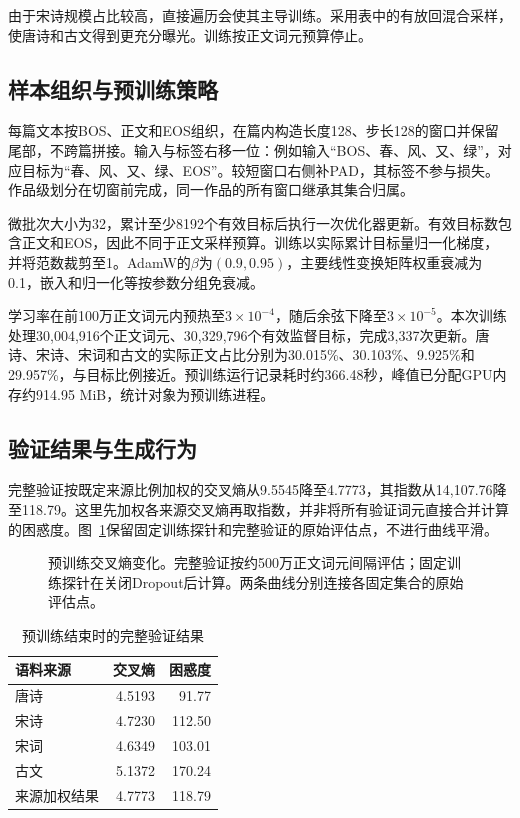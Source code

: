 由于宋诗规模占比较高，直接遍历会使其主导训练。采用表中的有放回混合采样，使唐诗和古文得到更充分曝光。训练按正文词元预算停止。

\subsection{样本组织与预训练策略}

每篇文本按BOS、正文和EOS组织，在篇内构造长度128、步长128的窗口并保留尾部，不跨篇拼接。输入与标签右移一位：例如输入“BOS、春、风、又、绿”，对应目标为“春、风、又、绿、EOS”。较短窗口右侧补PAD，其标签不参与损失。作品级划分在切窗前完成，同一作品的所有窗口继承其集合归属。

微批次大小为32，累计至少8192个有效目标后执行一次优化器更新。有效目标数包含正文和EOS，因此不同于正文采样预算。训练以实际累计目标量归一化梯度，并将范数裁剪至1。AdamW的$\beta$为$(0.9,0.95)$，主要线性变换矩阵权重衰减为0.1，嵌入和归一化等按参数分组免衰减。

学习率在前100万正文词元内预热至$3\times10^{-4}$，随后余弦下降至$3\times10^{-5}$。本次训练处理30,004,916个正文词元、30,329,796个有效监督目标，完成3,337次更新。唐诗、宋诗、宋词和古文的实际正文占比分别为30.015\%、30.103\%、9.925\%和29.957\%，与目标比例接近。预训练运行记录耗时约366.48秒，峰值已分配GPU内存约914.95 MiB，统计对象为预训练进程。

\subsection{验证结果与生成行为}

完整验证按既定来源比例加权的交叉熵从9.5545降至4.7773，其指数从14,107.76降至118.79。这里先加权各来源交叉熵再取指数，并非将所有验证词元直接合并计算的困惑度。图~\ref{fig:loss}保留固定训练探针和完整验证的原始评估点，不进行曲线平滑。

\begin{figure}[htbp]
 \centering
 \caption{预训练交叉熵变化。完整验证按约500万正文词元间隔评估；固定训练探针在关闭Dropout后计算。两条曲线分别连接各固定集合的原始评估点。}
 \label{fig:loss}
\end{figure}

\begin{table}[htbp]
 \centering\small
 \caption{预训练结束时的完整验证结果}\label{tab:pretrainmetrics}
 \begin{tabular}{lrr}
 \toprule 语料来源&交叉熵&困惑度\\\midrule
 唐诗&4.5193&91.77\\宋诗&4.7230&112.50\\宋词&4.6349&103.01\\古文&5.1372&170.24\\
 来源加权结果&4.7773&118.79\\\bottomrule
 \end{tabular}
\end{table}

